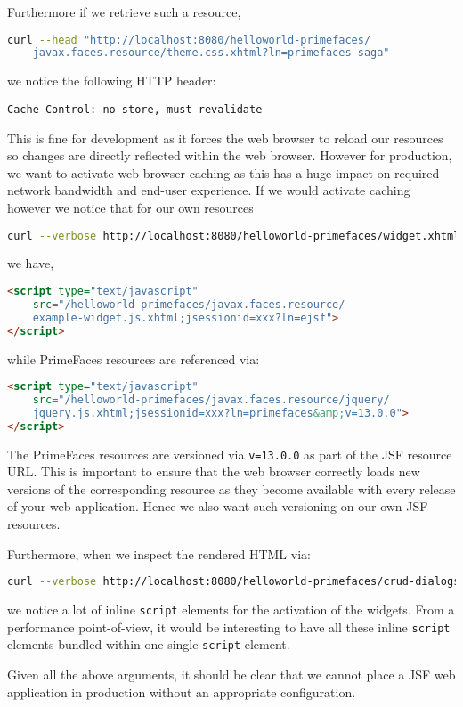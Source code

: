 Furthermore if we retrieve such a resource,
\begin{lstlisting}[language=bash]
curl --head "http://localhost:8080/helloworld-primefaces/
	javax.faces.resource/theme.css.xhtml?ln=primefaces-saga"
\end{lstlisting}
we notice the following HTTP header:
\begin{lstlisting}
Cache-Control: no-store, must-revalidate
\end{lstlisting}
This is fine for development as it forces the web browser to reload our resources so changes are directly reflected within the web browser.
However for production, we want to activate web browser caching as this has a huge impact on required network bandwidth and end-user experience.
If we would activate caching however we notice that for our own resources
\begin{lstlisting}[language=bash]
curl --verbose http://localhost:8080/helloworld-primefaces/widget.xhtml
\end{lstlisting}
we have,
\begin{lstlisting}[language=html]
<script type="text/javascript"
	src="/helloworld-primefaces/javax.faces.resource/
	example-widget.js.xhtml;jsessionid=xxx?ln=ejsf">
</script>
\end{lstlisting}
while PrimeFaces resources are referenced via:
\begin{lstlisting}[language=html]
<script type="text/javascript"
	src="/helloworld-primefaces/javax.faces.resource/jquery/
	jquery.js.xhtml;jsessionid=xxx?ln=primefaces&amp;v=13.0.0">
</script>
\end{lstlisting}
The PrimeFaces resources are versioned via \texttt{v=13.0.0} as part of the JSF resource URL.
This is important to ensure that the web browser correctly loads new versions of the corresponding resource as they become available with every release of your web application.
Hence we also want such versioning on our own JSF resources.

Furthermore, when we inspect the rendered HTML via:
\begin{lstlisting}[language=bash]
curl --verbose http://localhost:8080/helloworld-primefaces/crud-dialogs.xhtml
\end{lstlisting}
we notice a lot of inline \texttt{script} elements for the activation of the widgets.
From a performance point-of-view, it would be interesting to have all these inline \texttt{script} elements bundled within one single \texttt{script} element.

Given all the above arguments, it should be clear that we cannot place a JSF web application in production without an appropriate configuration.

